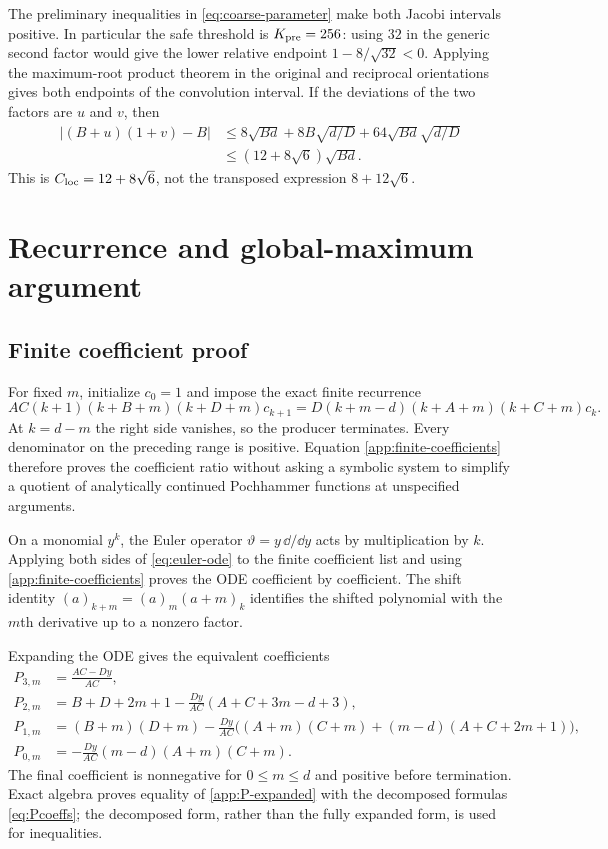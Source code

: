 The preliminary inequalities in \eqref{eq:coarse-parameter} make both
Jacobi intervals positive.  In particular the safe threshold is
$K_{\rm pre}=256$: using $32$ in the generic second factor would give the
lower relative endpoint $1-8/\sqrt{32}<0$.  Applying the maximum-root
product theorem in the original and reciprocal orientations gives both
endpoints of the convolution interval.  If the deviations of the two
factors are $u$ and $v$, then
\begin{align*}
 |(B+u)(1+v)-B|
 &\le8\sqrt{Bd}+8B\sqrt{d/D}
       +64\sqrt{Bd}\sqrt{d/D}\\
 &\le(12+8\sqrt6)\sqrt{Bd}.
\end{align*}
This is $C_{\rm loc}=12+8\sqrt6$, not the transposed expression
$8+12\sqrt6$.

\section{Recurrence and global-maximum argument}\label{app:recurrence-details}

\subsection{Finite coefficient proof}

For fixed $m$, initialize $c_0=1$ and impose the exact finite recurrence
\begin{equation}\label{app:finite-coefficients}
 AC(k+1)(k+B+m)(k+D+m)c_{k+1}
 =D(k+m-d)(k+A+m)(k+C+m)c_k.
\end{equation}
At $k=d-m$ the right side vanishes, so the producer terminates.  Every
denominator on the preceding range is positive.  Equation
\eqref{app:finite-coefficients} therefore proves the coefficient ratio
without asking a symbolic system to simplify a quotient of analytically
continued Pochhammer functions at unspecified arguments.

On a monomial $y^k$, the Euler operator $\vartheta=y\,\dd/\dd y$ acts by
multiplication by $k$.  Applying both sides of \eqref{eq:euler-ode} to the
finite coefficient list and using \eqref{app:finite-coefficients} proves the
ODE coefficient by coefficient.  The shift identity
$(a)_{k+m}=(a)_m(a+m)_k$ identifies the shifted polynomial with the $m$th
derivative up to a nonzero factor.

Expanding the ODE gives the equivalent coefficients
\begin{align}
 P_{3,m}&=\frac{AC-Dy}{AC},\nonumber\\
 P_{2,m}&=B+D+2m+1
 -\frac{Dy}{AC}(A+C+3m-d+3),\nonumber\\
 P_{1,m}&=(B+m)(D+m)
 -\frac{Dy}{AC}\bigl((A+m)(C+m)
 +(m-d)(A+C+2m+1)\bigr),\label{app:P-expanded}\\
 P_{0,m}&=-\frac{Dy}{AC}(m-d)(A+m)(C+m).\nonumber
\end{align}
The final coefficient is nonnegative for $0\le m\le d$ and positive before
termination.  Exact algebra proves equality of \eqref{app:P-expanded} with
the decomposed formulas \eqref{eq:Pcoeffs}; the decomposed form, rather than
the fully expanded form, is used for inequalities.

